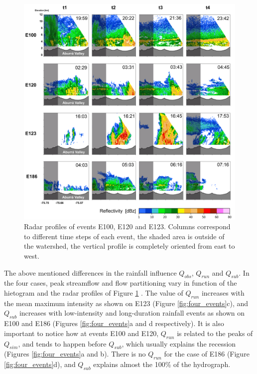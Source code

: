 \documentclass[preprint,12pt]{elsarticle}
\begin{document}
\begin{figure}[!h]
    \centering
    \includegraphics[width=14cm]{Figuras/Perfiles_Radar.png}
    \caption{Radar profiles of events E100, E120 and E123. Columns correspond to 
    different time steps of each event, the shaded area is outside of the watershed, the vertical profile is completely oriented from east to west.}
    \label{fig:radar_profiles}
\end{figure}

The above mentioned differences in the rainfall influence $Q_{obs}$, $Q_{run}$ and $Q_{sub}$.  In the four cases, peak streamflow and flow partitioning vary in function of the hietogram and the radar profiles of Figure  \ref{fig:radar_profiles} .  The value of $Q_{run}$ increases with the mean maximum intensity as shown on E123 (Figure \ref{fig:four_events}c), and $Q_{sub}$ increases with low-intensity and long-duration rainfall events as shown on  E100 and E186 (Figures \ref{fig:four_events}a and d respectively).  It is also important to notice how at events E100 and E120, $Q_{run}$ is related to the peaks of $Q_{sim}$, and tends to happen before $Q_{sub}$, which usually explains the recession (Figures \ref{fig:four_events}a and b). There is no $Q_{run}$ for the case of E186 (Figure \ref{fig:four_events}d), and $Q_{sub}$ explains almost the 100\% of the hydrograph.\\
\end{document}

